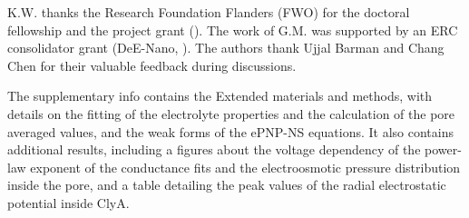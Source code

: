 \documentclass[journal=ancac3,manuscript=article,etalmode=truncate,maxauthors=0,layout=onecolumn]{achemso}
\begin{document}
\begin{acknowledgement}
K.W. thanks the Research Foundation Flanders (FWO) for the doctoral fellowship and the project grant
(). The work of G.M. was supported by an ERC consolidator grant (DeE-Nano, ). The
authors thank Ujjal Barman and Chang Chen for their valuable feedback during discussions.
\end{acknowledgement}

\begin{suppinfo}
	The supplementary info contains the Extended materials and methods, with details on the fitting of the
	electrolyte properties and the calculation of the pore averaged values, and the weak forms of the ePNP-NS
	equations. It also contains additional results, including a figures about the voltage dependency of the
	power-law exponent of the conductance fits and the electroosmotic pressure distribution inside the pore, and
	a table detailing the peak values of the radial electrostatic potential inside ClyA.
\end{suppinfo}



%
\end{document}
